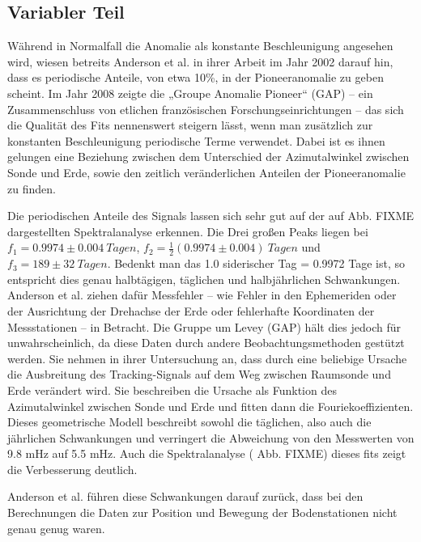 
\subsection{Variabler Teil}
Während in Normalfall die Anomalie als konstante Beschleunigung angesehen wird, wiesen betreits Anderson et al. in
ihrer Arbeit im Jahr 2002 darauf hin, dass es periodische Anteile, von etwa 10\%, in der Pioneeranomalie zu
geben scheint.
Im Jahr 2008 zeigte die „Groupe Anomalie Pioneer“ (GAP) – ein Zusammenschluss von etlichen französischen Forschungseinrichtungen –
das sich die Qualität des Fits nennenswert steigern lässt, wenn man zusätzlich zur konstanten Beschleunigung
periodische Terme verwendet.
Dabei ist es ihnen gelungen eine Beziehung zwischen dem Unterschied der Azimutalwinkel zwischen Sonde und Erde, sowie
den zeitlich veränderlichen Anteilen der Pioneeranomalie zu finden. %

Die periodischen Anteile des Signals lassen sich sehr gut auf der auf Abb. FIXME dargestellten Spektralanalyse
erkennen. Die Drei großen Peaks liegen bei $f_1=0.9974\pm0.004\ Tagen$, $f_2=\frac12(0.9974\pm0.004)\ Tagen$ und 
$f_3=189\pm32\ Tagen$. Bedenkt man das 1.0 siderischer Tag = 0.9972 Tage ist, so entspricht dies genau
halbtägigen, täglichen und halbjährlichen Schwankungen.
Anderson et al. ziehen dafür Messfehler – wie Fehler in den Ephemeriden oder der Ausrichtung der Drehachse der Erde
oder fehlerhafte Koordinaten der Messstationen – in Betracht. %
Die Gruppe um Levey (GAP) hält dies jedoch für unwahrscheinlich, da diese Daten durch andere Beobachtungsmethoden
gestützt werden. %
Sie nehmen in ihrer Untersuchung an, dass durch eine beliebige Ursache die Ausbreitung des Tracking-Signals auf dem Weg
zwischen Raumsonde und Erde verändert wird. Sie beschreiben die Ursache als Funktion des Azimutalwinkel zwischen Sonde und Erde und fitten
dann die Fouriekoeffizienten. Dieses geometrische Modell beschreibt sowohl die täglichen, also auch die jährlichen
Schwankungen und verringert die Abweichung von den Messwerten von 9.8 mHz auf 5.5 mHz. Auch die Spektralanalyse (
Abb. FIXME) dieses fits zeigt die Verbesserung deutlich.\cite{Levy2008} %

Anderson et al. führen diese Schwankungen darauf zurück, dass bei den Berechnungen die Daten zur Position und Bewegung
der Bodenstationen nicht genau genug waren.\cite{Dittus2006} %
